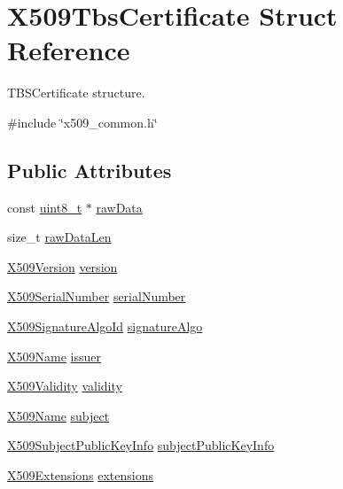 \hypertarget{structX509TbsCertificate}{}\section{X509\+Tbs\+Certificate Struct Reference}
\label{structX509TbsCertificate}


T\+B\+S\+Certificate structure.  




{\ttfamily \#include \char`\"{}x509\+\_\+common.\+h\char`\"{}}

\subsection*{Public Attributes}
\begin{DoxyCompactItemize}
\item 
const \hyperlink{stdint_8h_aba7bc1797add20fe3efdf37ced1182c5}{uint8\+\_\+t} $\ast$ \hyperlink{structX509TbsCertificate_ace5ec9ea3582843c4e81cdbbe4c3d0aa}{raw\+Data}
\item 
size\+\_\+t \hyperlink{structX509TbsCertificate_af8694e963e30d044b217305d089e7ecd}{raw\+Data\+Len}
\item 
\hyperlink{certificate_2x509__common_8h_a42c631650a1a4fbe9d70d54d99dcac26}{X509\+Version} \hyperlink{structX509TbsCertificate_a651e18b39b7492e6e739823ea19129d9}{version}
\item 
\hyperlink{structX509SerialNumber}{X509\+Serial\+Number} \hyperlink{structX509TbsCertificate_ae21529587634708bc0f5cc3aa0558a3a}{serial\+Number}
\item 
\hyperlink{structX509SignatureAlgoId}{X509\+Signature\+Algo\+Id} \hyperlink{structX509TbsCertificate_a6b7b1c8ebc69acd3317d38394961048a}{signature\+Algo}
\item 
\hyperlink{structX509Name}{X509\+Name} \hyperlink{structX509TbsCertificate_a8f9e1f73fbccfe993464a10bf6420a69}{issuer}
\item 
\hyperlink{structX509Validity}{X509\+Validity} \hyperlink{structX509TbsCertificate_ad2149392b07cf44a8b6421572a93a70e}{validity}
\item 
\hyperlink{structX509Name}{X509\+Name} \hyperlink{structX509TbsCertificate_a68e21bffb3f287f4e57378b275e1d178}{subject}
\item 
\hyperlink{structX509SubjectPublicKeyInfo}{X509\+Subject\+Public\+Key\+Info} \hyperlink{structX509TbsCertificate_ae6d392cbe0fcd240ab1dabaac465ca95}{subject\+Public\+Key\+Info}
\item 
\hyperlink{structX509Extensions}{X509\+Extensions} \hyperlink{structX509TbsCertificate_aa60d8b8a952d01fd8de02c2da091563e}{extensions}
\end{DoxyCompactItemize}



